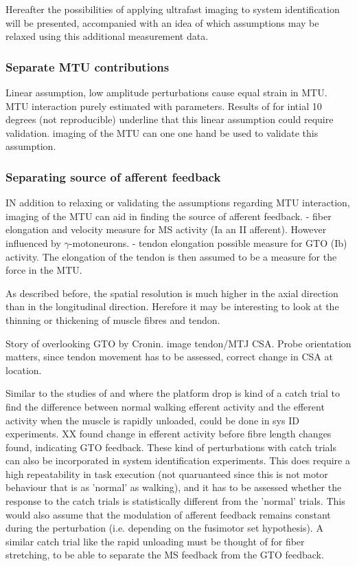 Hereafter the possibilities of applying ultrafast imaging to system identification will be presented, accompanied with an idea of which assumptions may be relaxed using this additional measurement data.



\subsubsection{Separate MTU contributions}
Linear assumption, low amplitude perturbations cause equal strain in MTU. MTU interaction purely estimated with parameters. Results of \citet{hauraix_shortening_2013} for intial 10 degrees (not reproducible) underline that this linear assumption could require validation. imaging of the MTU can one one hand be used to validate this assumption. 


\subsubsection{Separating source of afferent feedback}
IN addition to relaxing or validating the assumptions regarding MTU interaction, imaging of the MTU can aid in finding the source of afferent feedback. 
- fiber elongation and velocity measure for MS activity (Ia an II afferent). However influenced by $\gamma$-motoneurons. 
- tendon elongation possible measure for GTO (Ib) activity. The elongation of the tendon is then assumed to be a measure for the force in the MTU. 

As described before, the spatial resolution is much higher in the axial direction than in the longitudinal direction. Herefore it may be interesting to look at the thinning or thickening of muscle fibres and tendon. 

Story of overlooking GTO by Cronin. image tendon/MTJ CSA. Probe orientation matters, since tendon movement has to be assessed, correct change in CSA at location. 

Similar to the studies of \citet{af_klint_sudden_2009} and \citet{grey_positive_2007} where the platform drop is kind of a catch trial to find the difference between normal walking efferent activity and the efferent activity when the muscle is rapidly unloaded, could be done in sys ID experiments. XX found change in efferent activity before fibre length changes found, indicating GTO feedback. These kind of perturbations with catch trials can also be incorporated in system identification experiments. This does require a high repeatability in task execution (not quaruanteed since this is not motor behaviour that is as 'normal' as walking), and it has to be assessed whether the response to the catch trials is statistically different from the 'normal' trials. This would also assume that the modulation of afferent feedback remains constant during the perturbation (i.e. depending on the fusimotor set hypothesis). A similar catch trial like the rapid unloading must be thought of for fiber stretching, to be able to separate the MS feedback from the GTO feedback. 





